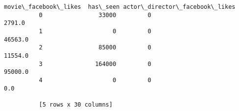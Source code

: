 \documentclass[11pt]{article}
\begin{document}
\begin{Verbatim}[commandchars=\\\{\}]
            movie\_facebook\_likes  has\_seen actor\_director\_facebook\_likes  
          0                33000         0                        2791.0  
          1                    0         0                       46563.0  
          2                85000         0                       11554.0  
          3               164000         0                       95000.0  
          4                    0         0                           0.0  
          
          [5 rows x 30 columns]
\end{Verbatim}
            

    
    
    
    
\end{document}
